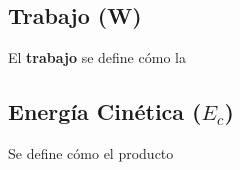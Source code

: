 \documentclass[../main.tex]{subfiles}
\begin{document}
\subsection{Trabajo (W)}
El \textbf{trabajo} se define cómo la 
\subsection{Energía Cinética ($E_c$)}
Se define cómo el producto
\end{document}
